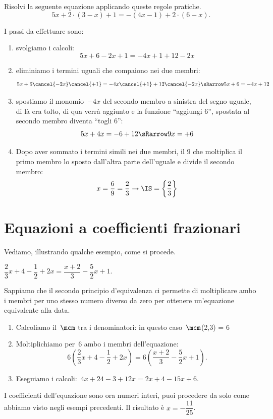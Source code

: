 \begin{problema}
 Risolvi la seguente equazione applicando queste regole pratiche.
 \[5x+2\cdot (3-x)+1=-(4x-1)+2\cdot (6-x).\]
\end{problema}

I passi da effettuare sono:
\begin{enumerate}
 \item svolgiamo i calcoli:
 \[5x+6-2x+1=-4x+1+12-2x\]
 \item eliminiamo i termini uguali che compaiono nei due membri:
 \[5x+6 \cancel{-2x}\cancel{+1}=-4x \cancel{+1}+12\cancel{-2x} \sRarrow 
5x+6=-4x+12\]
 \item spostiamo il monomio~\(-4x\) del secondo membro a sinistra del segno 
uguale, di là era tolto, di qua verrà aggiunto
e la funzione ``aggiungi \(6\)'', spostata al secondo membro diventa ``togli 
\(6\)'':
\[5x+4x=-6+12 \sRarrow 9x=+6\]
\item Dopo aver sommato i termini simili nei due membri, il 
\(9\) che moltiplica il primo membro lo sposto dall'altra parte dell'uguale e 
divide il secondo membro:
 \[x=\dfrac{6}{9} = \dfrac{2}{3}\to \IS =\left\{\dfrac{2}{3}\right\}\]
 \end{enumerate}

\section{Equazioni a coefficienti frazionari}
\label{sec:13_coefffraz}

Vediamo, illustrando qualche esempio, come si procede.

 \begin{esempio}
\(\dfrac{2}{3}x+4-\dfrac{1}{2}+2x=\dfrac{x+2}{3}-\dfrac{5}{2}x+1\).

Sappiamo che il secondo principio d'equivalenza ci
permette di moltiplicare ambo i membri per uno stesso numero diverso da
zero per ottenere un'equazione equivalente alla data.

\begin{enumerate}
 \item Calcoliamo il~\(\mcm\) tra i denominatori: in questo
caso~\(\mcm\)(2,3) = 6
 \item Moltiplichiamo per~6 ambo i membri
dell'equazione:
\[6\left(\dfrac{2}{3}x+4-\dfrac{1}{2}+2x\right)=6\left(\dfrac{x+2}{3}-\dfrac{5}{
2}x+1\right).\]
 \item Eseguiamo i calcoli:~\(4x+24-3+12x=2x+4-15x+6\).
\end{enumerate}

I coefficienti dell'equazione sono ora numeri interi,
puoi procedere da solo come abbiamo visto negli esempi precedenti. Il risultato 
è \(x=-\dfrac{11}{25}\).
\end{esempio}


